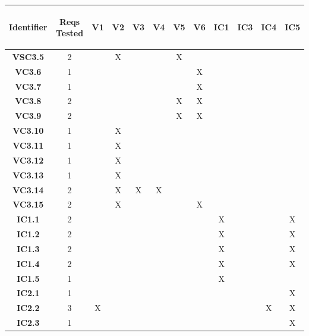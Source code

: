 \documentclass [10pt]{article}
\begin{document}
\begin{center}
\begin{tabularx} {.88\textwidth} {|c|c|c|c|c|c|c|c|c|c|c|c|} \hline
  \hspace {1.9mm} \textbf{Identifier \hspace {1.9mm} } & \begin{minipage} {.075\columnwidth} \vspace{1mm} \begin {center}\textbf{Reqs Tested}\vspace{1mm}\end{center}\end{minipage}
 & \textbf{V1} &\textbf{V2} &\textbf{V3} &\textbf{V4} &\textbf{V5} &\textbf{V6} &\textbf{IC1}  &\textbf{IC3} &\textbf{IC4}&\textbf{IC5}  \\ \hline
 \textbf{VSC3.5} &2& &X & & &X &  & & & &     \\ \hline
 \textbf{VC3.6}  &1& & & & & & X & & & &     \\ \hline
 \textbf{VC3.7}  &1& & & & & & X & & & &     \\ \hline
 \textbf{VC3.8}  &2& & & & &X & X & & & &     \\ \hline
 \textbf{VC3.9}  &2& & & & &X & X & & & &     \\ \hline
 \textbf{VC3.10} &1& & X& & & &  & & & &     \\ \hline
 \textbf{VC3.11} &1& & X& & & &  & & & &    \\ \hline
 \textbf{VC3.12} &1& & X& & & &  & & & &     \\ \hline
 \textbf{VC3.13} &1& & X& & & &  & & & &     \\ \hline
 \textbf{VC3.14} &2& & X& X& X& &  & & & &     \\ \hline
 \textbf{VC3.15} &2& & X& & & &  X& & & &     \\ \hline
 \textbf{IC1.1}  &2 & & & & & & &  X  & & & X \\ \hline
 \textbf{IC1.2}  &2& && & & & &  X& &  & X  \\ \hline 
 \textbf{IC1.3}  &2& & & & & & &  X & & & X  \\ \hline 
 \textbf{IC1.4}  &2& & & & & & &  X & & & X  \\ \hline 
 \textbf{IC1.5}  &1& & & & & & &  X & & &   \\ \hline 
 \textbf{IC2.1}  &1 & & & & & & &  & & & X \\ \hline
 \textbf{IC2.2}  &3& X& & & & & &  & &X & X  \\ \hline 
 \textbf{IC2.3}  &1& & & & & & & &  & & X  \\ \hline 

\end{tabularx}
\end{center}
\end{document}
